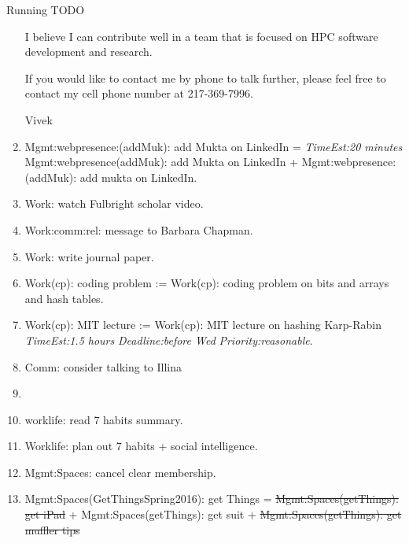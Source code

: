 \documentclass[serif, mathserif, final]{beamer}
\newcommand{\doneTaskNoItem}[1]{\sout{#1}}
\newcommand{\te}[1]{\textit{TimeEst:}\textit{#1}}
\newcommand{\dl}[1]{\textit{Deadline:}\textit{#1}}
\newcommand{\pr}[1]{\textit{Priority:}\textit{#1}}
\begin{document}
\begin{frame}
\begin{columns}
\begin{column}{0.50\linewidth}
\begin{block}{Running TODO}
\begin{enumerate}
I believe I can contribute well in a team that is focused on HPC software
development and research. 

If you would like to contact me by phone to talk further, please feel
free to contact my cell phone number at 217-369-7996.

Vivek
                   
        \item \tiny Mgmt:webpresence:(addMuk): add Mukta on LinkedIn =
          \te{20 minutes} 
          Mgmt:webpresence(addMuk): add Mukta on LinkedIn +
          Mgmt:webpresence:(addMuk): add mukta on LinkedIn. 

        \item \tiny Work: watch Fulbright scholar video. 
          

        \item \tiny Work:comm:rel: message to Barbara Chapman. 
        \item \tiny Work: write journal paper.  

        \item \tiny Work(cp): coding problem := Work(cp): coding problem on
          bits and arrays and hash tables.
          
        \item \tiny Work(cp): MIT lecture := Work(cp): MIT lecture on
          hashing Karp-Rabin \te{1.5 hours} \dl{before Wed}
          \pr{reasonable}. 

        \item \tiny Comm: consider talking to Illina 

        \item \tiny 

        \item \tiny worklife: read 7 habits summary. 
        \item \tiny Worklife: plan out 7 habits + social
          intelligence. 

        \item \tiny Mgmt:Spaces: cancel clear membership.  

        \item \tiny Mgmt:Spaces(GetThingsSpring2016): get Things =
          \doneTaskNoItem{Mgmt:Spaces(getThings): get iPad} + Mgmt:Spaces(getThings):
          get suit + \doneTaskNoItem{Mgmt:Spaces(getThings): get
            muffler tips}

        \end{enumerate}
      \end{block} 


\end{column}
\end{columns}
\end{frame}
\end{document}
